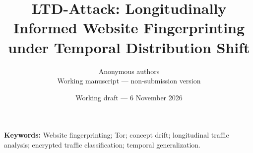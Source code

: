 \documentclass[11pt,a4paper]{article}
\title{LTD-Attack: Longitudinally Informed Website Fingerprinting under Temporal Distribution Shift}
\author{Anonymous authors\\\small Working manuscript --- non-submission version}
\date{Working draft --- 6 November 2026}
\begin{document}
\maketitle
\begin{abstract}

\end{abstract}
\noindent\textbf{Keywords:} Website fingerprinting; Tor; concept drift; longitudinal traffic analysis; encrypted traffic classification; temporal generalization.
\tableofcontents
\clearpage











\appendix


\end{document}
